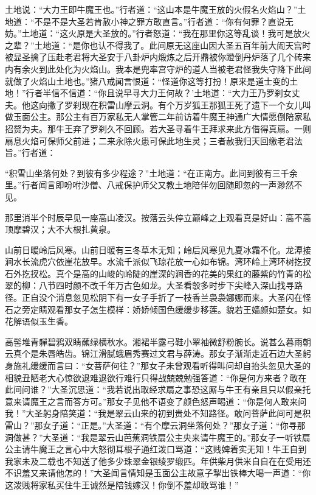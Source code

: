 \documentclass[12pt,UTF8]{ctexbook}
\begin{document}
土地说：“大力王即牛魔王也。”行者道：“这山本是牛魔王放的火假名火焰山？”土地道：“不是不是大圣若肯赦小神之罪方敢直言。”行者道：“你有何罪？直说无妨。”土地道：“这火原是大圣放的。”行者怒道：“我在那里你这等乱谈！我可是放火之辈？”土地道：“是你也认不得我了。此间原无这座山因大圣五百年前大闹天宫时被显圣擒了压赴老君将大圣安于八卦炉内煅炼之后开鼎被你蹬倒丹炉落了几个砖来内有余火到此处化为火焰山。我本是兜率宫守炉的道人当被老君怪我失守降下此间就做了火焰山土地也。”猪八戒闻言恨道：“怪道你这等打扮！原来是道士变的土地！”行者半信不信道：“你且说早寻大力王何故？’土地道：“大力王乃罗刹女丈夫。他这向撇了罗刹现在积雷山摩云洞。有个万岁狐王那狐王死了遗下一个女儿叫做玉面公主。那公主有百万家私无人掌管二年前访着牛魔王神通广大情愿倒陪家私招赘为夫。那牛王弃了罗刹久不回顾。若大圣寻着牛王拜求来此方借得真扇。一则扇息火焰可保师父前进；二来永除火患可保此地生灵；三者赦我归天回缴老君法旨。”行者道：

“积雪山坐落何处？到彼有多少程途？”土地道：“在正南方。此间到彼有三千余里。”行者闻言即吩咐沙僧、八戒保护师父又教土地陪伴勿回随即忽的一声渺然不见。

那里消半个时辰早见一座高山凌汉。按落云头停立巅峰之上观看真是好山：高不高顶摩碧汉；大不大根扎黄泉。

山前日暖岭后风寒。山前日暖有三冬草木无知；岭后风寒见九夏冰霜不化。龙潭接涧水长流虎穴依崖花放早。水流千派似飞琼花放一心如布锦。湾环岭上湾环树扢扠石外扢扠松。真个是高的山峻的岭陡的崖深的涧香的花美的果红的藤紫的竹青的松翠的柳：八节四时颜不改千年万古色如龙。大圣看彀多时步下尖峰入深山找寻路径。正自没个消息忽见松阴下有一女子手折了一枝香兰袅袅娜娜而来。大圣闪在怪石之旁定睛观看那女子怎生模样：娇娇倾国色缓缓步移莲。貌若王嫱颜如楚女。如花解语似玉生香。

高髻堆青軃碧鸦双睛蘸绿横秋水。湘裙半露弓鞋小翠袖微舒粉腕长。说甚么暮雨朝云真个是朱唇皓齿。锦江滑腻蛾眉秀赛过文君与薛涛。那女子渐渐走近石边大圣躬身施礼缓缓而言曰：“女菩萨何往？”那女子未曾观看听得叫问却自抬头忽见大圣的相貌丑陋老大心惊欲退难退欲行难行只得战兢兢勉强答道：“你是何方来者？敢在此间问谁？”大圣沉思道：“我若说出取经求扇之事恐这厮与牛王有亲且只以假亲托意来请魔王之言而答方可。”那女子见他不语变了颜色怒声喝道：“你是何人敢来问我！”大圣躬身陪笑道：“我是翠云山来的初到贵处不知路径。敢问菩萨此间可是积雷山？”那女子道：“正是。”大圣道：“有个摩云洞坐落何处？”那女子道：“你寻那洞做甚？”大圣道：“我是翠云山芭蕉洞铁扇公主央来请牛魔王的。”那女子一听铁扇公主请牛魔王之言心中大怒彻耳根子通红泼口骂道：“这贱婢着实无知！牛王自到我家未及二载也不知送了他多少珠翠金银绫罗缎匹。年供柴月供米自自在在受用还不识羞又来请他怎的！”大圣闻言情知是玉面公主故意子掣出铁棒大喝一声道：“你这泼贱将家私买住牛王诚然是陪钱嫁汉！你倒不羞却敢骂谁！”
\end{document}
